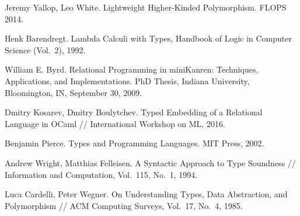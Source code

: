 \documentclass{llncs}
\begin{document}
\begin{thebibliography}{99}

Jeremy Yallop, Leo White. Lightweight Higher-Kinded Polymorphism. FLOPS 2014.

Henk Barendregt. Lambda Calculi with Types, Handbook of Logic in Computer Science (Vol.~2), 1992.

William E. Byrd. Relational Programming in miniKanren: Techniques, Applications, and Implementations. PhD Thesis,
Indiana University, Bloomington, IN, September 30, 2009.

Dmitry Kosarev, Dmitry Boulytchev. Typed Embedding of a Relational Language in OCaml // International Workshop on ML, 2016.

Benjamin Pierce. Types and Programming Languages. MIT Press, 2002.

Andrew Wright, Matthias Felleisen. A Syntactic Approach to Type Soundness // Information and Computation, Vol.~115, No.~1, 1994.

Luca Cardelli, Peter Wegner. On Understanding Types, Data Abstraction, and Polymorphism // ACM Computing Surveys, Vol.~17, No.~4, 1985.
\end{thebibliography}
\end{document}
